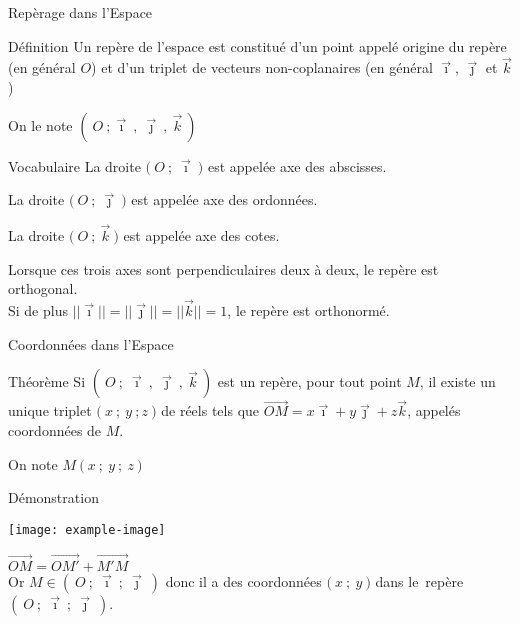 \documentclass{cours}
\begin{document}
    \begin{Gpartie}{Repèrage dans l'Espace} 
        \begin{Spartie}{Définition} 
            Un repère de l'espace est constitué d'un point appelé origine du repère (en général $O$) et d'un triplet de vecteurs non-coplanaires (en général $\vec{\imath}$, $\vec{\jmath}$ et $\vec{k}$)

            On le note $\left(~O~;\vec{\imath}~,~\vec{\jmath}~,~\vec{k}~\right)$
        \end{Spartie}
        \begin{Spartie}{Vocabulaire} 
            La droite $\big(~O~;~\vec{\imath}~\big)$ est appelée axe des abscisses.

            La droite $\big(~O~;~\vec{\jmath}~\big)$ est appelée axe des ordonnées.

            La droite $\big(~O~;~\vec{k}~\big)$ est appelée axe des cotes.

            Lorsque ces trois axes sont perpendiculaires deux à deux, le repère est orthogonal. \\ Si de plus $\lvert\lvert\vec{\imath}\rvert\rvert=\lvert\lvert\vec{\jmath}\rvert\rvert=\lvert\lvert\vec{k}\rvert\rvert=1$, le repère est orthonormé.
        \end{Spartie}
        \pagebreak
        \begin{Spartie}{Coordonnées dans l'Espace} 
            \begin{SSpartie}{Théorème} 
                Si $\left(~O~;~\vec{\imath}~,~\vec{\jmath}~,~\vec{k}~\right)$ est un repère, pour tout point $M$, il existe un unique triplet $\big(~x~;~y~;z~\big)$ de réels tels que $\overrightarrow{OM}=x\vec{\imath}+y\vec{\jmath}+z\vec{k}$, appelés coordonnées de $M$.

                On note $M~\big(~x~;~y~;~z~\big)$
                \begin{SSSpartie}{Démonstration} 
                    \begin{center}
                            \texttt{[image: example-image]}
                            \parbox{\linewidth}{}        
                    \end{center}
                    $\overrightarrow{OM}=\overrightarrow{OM'}+\overrightarrow{M'M}$ \\
                    Or $M\in\left(~O~;~\vec{\imath}~;~\vec{\jmath}~\right)$ donc il a des coordonnées $\big(~x~;~y~\big)$ dans le~repère~$\left(~O~;~\vec{\imath}~;~\vec{\jmath}~\right)$.


\end{SSSpartie}
\end{SSpartie}
\end{Spartie}
\end{Gpartie}
\end{document}

